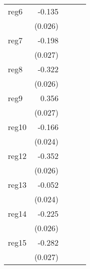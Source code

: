 {\begin{longtable}{l*{4}{D{.}{.}{-1}}}
\addlinespace
reg6        &      -0.135\sym{***}&                     &                     &                     \\
            &     (0.026)         &                     &                     &                     \\
\addlinespace
reg7        &      -0.198\sym{***}&                     &                     &                     \\
            &     (0.027)         &                     &                     &                     \\
\addlinespace
reg8        &      -0.322\sym{***}&                     &                     &                     \\
            &     (0.026)         &                     &                     &                     \\
\addlinespace
reg9        &       0.356\sym{***}&                     &                     &                     \\
            &     (0.027)         &                     &                     &                     \\
\addlinespace
reg10       &      -0.166\sym{***}&                     &                     &                     \\
            &     (0.024)         &                     &                     &                     \\
\addlinespace
reg12       &      -0.352\sym{***}&                     &                     &                     \\
            &     (0.026)         &                     &                     &                     \\
\addlinespace
reg13       &      -0.052\sym{*}  &                     &                     &                     \\
            &     (0.024)         &                     &                     &                     \\
\addlinespace
reg14       &      -0.225\sym{***}&                     &                     &                     \\
            &     (0.026)         &                     &                     &                     \\
\addlinespace
reg15       &      -0.282\sym{***}&                     &                     &                     \\
            &     (0.027)         &                     &                     &                     \\

\end{longtable}}
